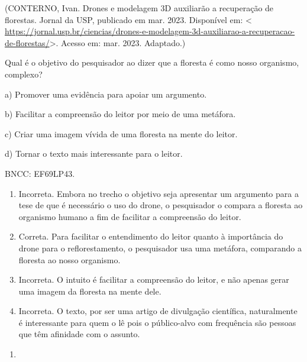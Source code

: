 (CONTERNO, Ivan. Drones e modelagem 3D auxiliarão a recuperação de
florestas. Jornal da USP, publicado em mar. 2023. Disponível em:
\textless{}
\url{https://jornal.usp.br/ciencias/drones-e-modelagem-3d-auxiliarao-a-recuperacao-de-florestas/}\textgreater.
Acesso em: mar. 2023. Adaptado.)

Qual é o objetivo do pesquisador ao dizer que a floresta é como nosso
organismo, complexo?

a) Promover uma evidência para apoiar um argumento.

b) Facilitar a compreensão do leitor por meio de uma metáfora.

c) Criar uma imagem vívida de uma floresta na mente do leitor.

d) Tornar o texto mais interessante para o leitor.

BNCC: EF69LP43.

\begin{enumerate}
\def\labelenumi{\alph{enumi})}
\item
  Incorreta. Embora no trecho o objetivo seja apresentar um argumento
  para a tese de que é necessário o uso do drone, o pesquisador o
  compara a floresta ao organismo humano a fim de facilitar a
  compreensão do leitor.
\item
  Correta. Para facilitar o entendimento do leitor quanto à importância
  do drone para o reflorestamento, o pesquisador usa uma metáfora,
  comparando a floresta ao nosso organismo.
\item
  Incorreta. O intuito é facilitar a compreensão do leitor, e não apenas
  gerar uma imagem da floresta na mente dele.
\item
  Incorreta. O texto, por ser uma artigo de divulgação científica,
  naturalmente é interessante para quem o lê pois o público-alvo com
  frequência são pessoas que têm afinidade com o assunto.
\end{enumerate}

\begin{enumerate}
\def\labelenumi{\arabic{enumi}.}
\setcounter{enumi}{11}
\tightlist
\item
\end{enumerate}

